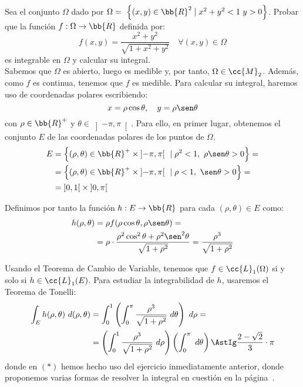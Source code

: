 \begin{ejercicio}
    Sea el conjunto $\Omega$ dado por $\Omega=~\left\{(x,y)\in \bb{R}^2 \mid x^2+y^2<1~y>0\right\}$. Probar que la función \( f:\Omega\to \bb{R} \) definida por:
    \[ f(x,y) = \dfrac{x^2+y^2}{\sqrt{1+x^2+y^2}} \quad \forall (x,y)\in \Omega \]
    es integrable en \( \Omega \) y calcular su integral.\\

    Sabemos que $\Omega$ es abierto, luego es medible y, por tanto, $\Omega\in \cc{M}_2$. Además, como $f$ es continua, tenemos que $f$ es medible.
    Para calcular su integral, haremos uso de coordenadas polares escribiendo:
    \begin{equation*}
        x = \rho\cos\theta, \quad y = \rho\sen\theta
    \end{equation*}
    con $\rho\in \bb{R}^+$ y $\theta\in \left]-\pi, \pi\right[$. Para ello, en primer lugar, obtenemos el conjunto $E$ de las coordenadas polares de los puntos de $\Omega$.
    \begin{align*}
        E &= \left\{ (\rho, \theta) \in \bb{R}^+\times \left]-\pi, \pi\right[ ~\mid \rho^2 < 1,~\rho\sen\theta > 0 \right\} =\\
        &= \left\{ (\rho, \theta) \in \bb{R}^+\times \left]-\pi, \pi\right[ ~\mid \rho < 1,~\sen\theta > 0 \right\} =\\
        &= \left]0, 1\right[\times \left]0, \pi\right[
    \end{align*}

    Definimos por tanto la función $h: E \to \bb{R}$ para cada $(\rho, \theta) \in E$ como:
    \begin{align*}
        h(\rho, \theta) &= \rho f(\rho\cos\theta, \rho\sen\theta)=\\
        &= \rho\cdot \dfrac{\rho^2\cos^2\theta+\rho^2\sen^2\theta}{\sqrt{1+\rho^2}}
        = \dfrac{\rho^3}{\sqrt{1+\rho^2}}
    \end{align*}

    Usando el Teorema de Cambio de Variable, tenemos que $f\in \cc{L}_1(\Omega)$ si y solo si $h\in \cc{L}_1(E)$. Para estudiar la integrabilidad de $h$, usaremos el Teorema de Tonelli:
    \begin{align*}
        \int_E h(\rho, \theta)~d(\rho, \theta) &=
        \int_0^1 \left( \int_0^{\pi} \dfrac{\rho^3}{\sqrt{1+\rho^2}}~d\theta \right)~d\rho =\\
        &= \left( \int_0^1 \dfrac{\rho^3}{\sqrt{1+\rho^2}}~d\rho \right) \left( \int_0^{\pi}~d\theta \right)
        \AstIg \dfrac{2-\sqrt{2}}{3} \cdot \pi
    \end{align*}
    donde en $(\ast)$ hemos hecho uso del ejercicio inmediatamente anterior, donde proponemos varias formas de resolver la integral en cuestión en la página~\pageref{desc:optInt}.
\end{ejercicio}


